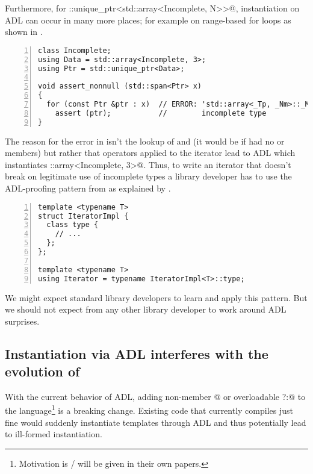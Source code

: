 Furthermore, for \codelst@std::unique_ptr<std::array<Incomplete, N>>@, instantiation on 
ADL can occur in many more places; for example on range-based for loops as shown in 
.
\begin{lstlisting}[style=Vc,numbers=left,float={hbtp},label=lst:iterating_uniqptr,caption={
Iteration over \code{std::span<std::unique_ptr<std::array<Incomplete, N>>>} is ill-formed
}]
class Incomplete;
using Data = std::array<Incomplete, 3>;
using Ptr = std::unique_ptr<Data>;

void assert_nonnull (std::span<Ptr> x)
{
  for (const Ptr &ptr : x)  // ERROR: 'std::array<_Tp, _Nm>::_M_elems' has
    assert (ptr);           //        incomplete type
}
\end{lstlisting}
The reason for the error in  isn't the lookup of  and 
 (it would be if  had no  or  members) but rather 
that operators applied to the iterator lead to ADL which instantiates 
\codelst@std::array<Incomplete, 3>@. Thus, to write an iterator that doesn't break on 
legitimate use of incomplete types a library developer has to use the ADL-proofing pattern 
from  as explained by \textcite{P2538R0}.
\begin{lstlisting}[style=Vc,numbers=left,float={hbtp},label=lst:adlproofediterator,caption={
ADL-proofed iterator type
}]
template <typename T>
struct IteratorImpl {
  class type {
    // ...
  };
};

template <typename T>
using Iterator = typename IteratorImpl<T>::type;
\end{lstlisting}
We might expect standard library developers to learn and apply this pattern. But we should 
not expect from any other \CC{} library developer to work around ADL surprises.

\subsection{Instantiation via ADL interferes with the evolution of \CC{}}\label{blocking}

With the current behavior of ADL, adding non-member \codelst@operator[]@ or overloadable 
\codelst@operator?:@ \citep{P0917R3} to the language\footnote{Motivation is / will be 
given in their own papers.} is a breaking change. Existing code that currently compiles 
just fine would suddenly instantiate templates through ADL and thus potentially lead to 
ill-formed instantiation.

